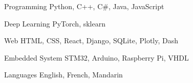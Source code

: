 

\begin{cvskills}

  \cvskill
    {Programming} %
    {Python, C++, C\#, Java, JavaScript} %

  \cvskill
    {Deep Learning} %
    {PyTorch, sklearn} %

  \cvskill
    {Web} %
    {HTML, CSS, React, Django, SQLite, Plotly, Dash} %

  \cvskill
    {Embedded System} %
    {STM32, Arduino, Raspberry Pi, VHDL} %

  \cvskill
    {Languages} %
    {English, French, Mandarin} %

\end{cvskills}
